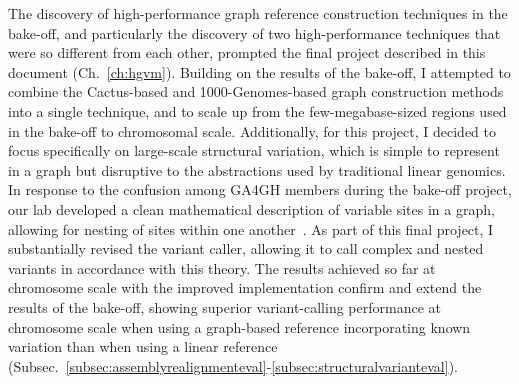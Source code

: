 
The discovery of high-performance graph reference construction techniques in the bake-off, and particularly the discovery of two high-performance techniques that were so different from each other, prompted the final project described in this document (Ch.~\ref{ch:hgvm}). Building on the results of the bake-off, I attempted to combine the Cactus-based and 1000-Genomes-based graph construction methods into a single technique, and to scale up from the few-megabase-sized regions used in the bake-off to chromosomal scale. Additionally, for this project, I decided to focus specifically on large-scale structural variation, which is simple to represent in a graph but disruptive to the abstractions used by traditional linear genomics. In response to the confusion among GA4GH members during the bake-off project, our lab developed a clean mathematical description of variable sites in a graph, allowing for nesting of sites within one another~\cite{paten2017superbubbles}. As part of this final project, I substantially revised the \vg variant caller, allowing it to call complex and nested variants in accordance with this theory. The results achieved so far at chromosome scale with the improved \vg implementation confirm and extend the results of the bake-off, showing superior variant-calling performance at chromosome scale when using a graph-based reference incorporating known variation than when using a linear reference (Subsec.~\ref{subsec:assemblyrealignmenteval}-\ref{subsec:structuralvarianteval}).

